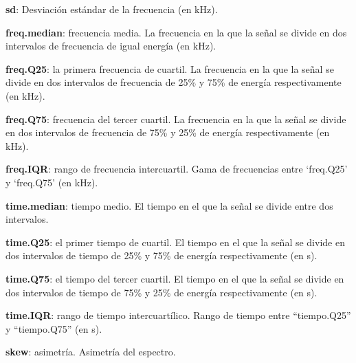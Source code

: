 \documentclass[
]{article}
\begin{document}
\vspace{6pt}

\textbf{sd}: Desviación estándar de la frecuencia (en kHz).

\vspace{6pt}

\textbf{freq.median}: frecuencia media. La frecuencia en la que la señal
se divide en dos intervalos de frecuencia de igual energía (en kHz).

\vspace{6pt}

\textbf{freq.Q25}: la primera frecuencia de cuartil. La frecuencia en la
que la señal se divide en dos intervalos de frecuencia de 25\% y 75\% de
energía respectivamente (en kHz).

\vspace{6pt}

\textbf{freq.Q75}: frecuencia del tercer cuartil. La frecuencia en la
que la señal se divide en dos intervalos de frecuencia de 75\% y 25\% de
energía respectivamente (en kHz).

\vspace{6pt}

\textbf{freq.IQR}: rango de frecuencia intercuartil. Gama de frecuencias
entre `freq.Q25' y `freq.Q75' (en kHz).

\vspace{6pt}

\textbf{time.median}: tiempo medio. El tiempo en el que la señal se
divide entre dos intervalos.

\vspace{6pt}

\textbf{time.Q25}: el primer tiempo de cuartil. El tiempo en el que la
señal se divide en dos intervalos de tiempo de 25\% y 75\% de energía
respectivamente (en s).

\vspace{6pt}

\textbf{time.Q75}: el tiempo del tercer cuartil. El tiempo en el que la
señal se divide en dos intervalos de tiempo de 75\% y 25\% de energía
respectivamente (en s).

\vspace{6pt}

\textbf{time.IQR}: rango de tiempo intercuartílico. Rango de tiempo
entre ``tiempo.Q25'' y ``tiempo.Q75'' (en s).

\vspace{6pt}

\textbf{skew}: asimetría. Asimetría del espectro.
\end{document}
